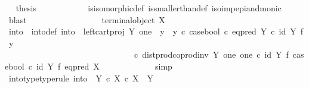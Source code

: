 \begin{isabellebody}
\ \isamarkupfalse%
\ {\isacharquery}{\kern0pt}thesis\isanewline
\ \ \ \ \ \ \ \ \ \ \isamarkupfalse%
\ is{\isacharunderscore}{\kern0pt}isomorphic{\isacharunderscore}{\kern0pt}def\ is{\isacharunderscore}{\kern0pt}smaller{\isacharunderscore}{\kern0pt}than{\isacharunderscore}{\kern0pt}def\ iso{\isacharunderscore}{\kern0pt}imp{\isacharunderscore}{\kern0pt}epi{\isacharunderscore}{\kern0pt}and{\isacharunderscore}{\kern0pt}monic\ \isamarkupfalse%
\ blast\isanewline
\ \ \ \ \ \ \isamarkupfalse%
\isanewline
\ \ \ \ \ \ \ \ \isamarkupfalse%
\ {\isachardoublequoteopen}{\isasymnot}\ terminal{\isacharunderscore}{\kern0pt}object\ X{\isachardoublequoteclose}\isanewline
\isanewline
\ \ \ \ \ \ \ \ \isamarkupfalse%
\ into\ \ into{\isacharunderscore}{\kern0pt}def{\isacharcolon}{\kern0pt}\ {\isachardoublequoteopen}into\ {\isacharequal}{\kern0pt}\ {\isacharparenleft}{\kern0pt}left{\isacharunderscore}{\kern0pt}cart{\isacharunderscore}{\kern0pt}proj\ Y\ one\ {\isasymamalg}\ {\isacharparenleft}{\kern0pt}{\isacharparenleft}{\kern0pt}y{}\ {\isasymamalg}\ y{}{\isacharparenright}{\kern0pt}\ {\isasymcirc}\isactrlsub c\ case{\isacharunderscore}{\kern0pt}bool\ {\isasymcirc}\isactrlsub c\ eq{\isacharunderscore}{\kern0pt}pred\ Y\ {\isasymcirc}\isactrlsub c\ {\isacharparenleft}{\kern0pt}id\ Y\ {\isasymtimes}\isactrlsub f\ y{}{\isacharparenright}{\kern0pt}{\isacharparenright}{\kern0pt}{\isacharparenright}{\kern0pt}\ \isanewline
\ \ \ \ \ \ \ \ \ \ \ \ \ \ \ \ \ \ \ \ \ \ \ \ \ \ \ \ \ \ \ {\isasymcirc}\isactrlsub c\ dist{\isacharunderscore}{\kern0pt}prod{\isacharunderscore}{\kern0pt}coprod{\isacharunderscore}{\kern0pt}inv\ Y\ one\ one\ {\isasymcirc}\isactrlsub c\ {\isacharparenleft}{\kern0pt}id\ Y\ {\isasymtimes}\isactrlsub f\ case{\isacharunderscore}{\kern0pt}bool{\isacharparenright}{\kern0pt}\ {\isasymcirc}\isactrlsub c\ {\isacharparenleft}{\kern0pt}id\ Y\ {\isasymtimes}\isactrlsub f\ eq{\isacharunderscore}{\kern0pt}pred\ X{\isacharparenright}{\kern0pt}\ {\isachardoublequoteclose}\isanewline
\ \ \ \ \ \ \ \ \ \ \isamarkupfalse%
\ simp\isanewline
\ \ \ \ \ \ \ \ \isamarkupfalse%
\ \isamarkupfalse%
\ into{\isacharunderscore}{\kern0pt}type{\isacharbrackleft}{\kern0pt}type{\isacharunderscore}{\kern0pt}rule{\isacharbrackright}{\kern0pt}{\isacharcolon}{\kern0pt}\ {\isachardoublequoteopen}into\ {\isacharcolon}{\kern0pt}\ Y\ {\isasymtimes}\isactrlsub c\ {\isacharparenleft}{\kern0pt}X\ {\isasymtimes}\isactrlsub c\ X{\isacharparenright}{\kern0pt}\ {\isasymrightarrow}\ Y{\isachardoublequoteclose}\isanewline

\end{isabellebody}
